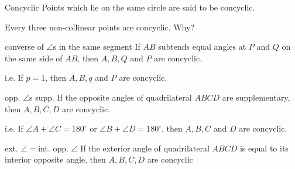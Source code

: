 
\begin{mysubsection}{}
    \begin{definition}[def:]{Concyclic}
        Points which lie on the same circle are said to be concyclic.
    \end{definition}

    Every three non-collinear points are concyclic. Why?

    \begin{theorem}[thm:]{converse of $\angle $s in the same segment}
        If $AB$ subtends equal angles at $P$ and $Q$ on the same side of $AB$, then $A,B,Q$ and $P$ are concyclic.

            i.e. If $p=1$, then $A,B,q$ and $P$ are concyclic.
    \end{theorem}
    \vspace{2em}

    \begin{theorem}[thm:]{opp. $\angle$s supp.}
        If the opposite angles of quadrilateral $ABCD$ are supplementary, then $A,B,C,D$ are concyclic.

            i.e. If $\angle A+\angle C=180^{\circ}$ or $\angle B+\angle D=180^{\circ}$, then $A,B,C$ and $D$ are concyclic.
    \end{theorem}
    \vspace{2em}

    \begin{theorem}[thm:]{ext. $\angle =$int. opp. $\angle $}
        If the exterior angle of quadrilateral $ABCD$ is equal to its interior opposite angle, then $A,B,C,D$ are concyclic
    \end{theorem}
\end{mysubsection}

